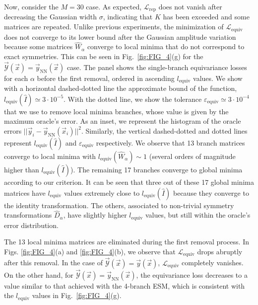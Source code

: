 Now, consider the $M = 30$ case. As expected, $\mathcal{L}_{\mathrm{rep}}$ does not vanish after decreasing the Gaussian width $\sigma$, indicating that $K$ has been exceeded and some matrices are repeated. Unlike previous experiments, the minimization of $\mathcal{L}_{\mathrm{equiv}}$ does not converge to its lower bound after the Gaussian amplitude variation because some matrices $\hat{W}_{\alpha}$ converge to local minima that do not correspond to exact symmetries. This can be seen in Fig.~\ref{fig:FIG_4}(g) for the $\vec{\mathcal{Y}}(\vec{x}) = \vec{y}_{\mathrm{NN}} (\vec{x})$ case. The panel shows the single-branch equivariance losses for each $\alpha$ before the first removal, ordered in ascending $l_{\mathrm{equiv}}$ values. We show with a horizontal dashed-dotted line the approximate bound of the function, $l_{\mathrm{equiv}}(\hat{I}) \simeq 3 \cdot 10^{-5}$. With the dotted line, we show the tolerance $\varepsilon_{\mathrm{equiv}} \simeq 3 \cdot 10^{-4}$ that we use to remove local minima branches, whose value is given by the maximum oracle's error. As an inset, we represent the histogram of the oracle errors $|| \vec{y}_i - \vec{y}_{\mathrm{NN}} (\vec{x}_i) ||^2$. Similarly, the vertical dashed-dotted and dotted lines represent $l_{\mathrm{equiv}}(\hat{I})$ and $\varepsilon_{\mathrm{equiv}}$ respectively. We observe that 13 branch matrices converge to local minima with $l_{\mathrm{equiv}} (\hat{W}_{\alpha}) \sim 1$ (several orders of magnitude higher than $l_{\mathrm{equiv}}(\hat{I})$). The remaining 17 branches converge to global minima according to our criterion. It can be seen that  three out of these 17 global minima matrices have $l_{\mathrm{equiv}}$ values extremely close to $l_{\mathrm{equiv}}(\hat{I})$ because they converge to the identity transformation. The others, associated to non-trivial symmetry transformations $\hat{D}_{\alpha}$, have slightly higher $l_{\mathrm{equiv}}$ values, but still within the oracle's error distribution. 


The 13 local minima matrices are eliminated during the first removal process. In Figs. \ref{fig:FIG_4}(a) and \ref{fig:FIG_4}(b), we observe that $\mathcal{L}_{\mathrm{equiv}}$ drops abruptly after this removal. In the case of $\vec{\mathcal{Y}} (\vec{x}) = \vec{y} (\vec{x})$, $\mathcal{L}_{\mathrm{equiv}}$ completely vanishes. On the other hand, for $\vec{\mathcal{Y}} (\vec{x}) = \vec{y}_{\mathrm{NN}} (\vec{x})$, the equivariance loss decreases to a value similar to that achieved with the 4-branch ESM, which is consistent with the $l_{\mathrm{equiv}}$ values in Fig.~\ref{fig:FIG_4}(g).

